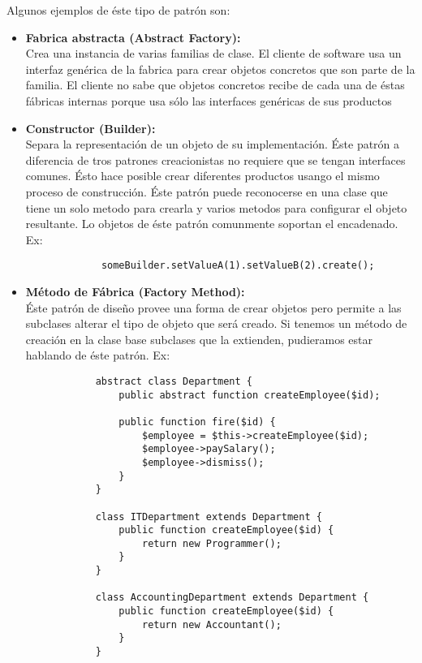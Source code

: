 \documentclass[12pt,article,oneside]{memoir}
\begin{document}
		Algunos ejemplos de \'este tipo de patr\'on son:
		
		\begin{itemize}
			\item \textbf{Fabrica abstracta (Abstract Factory):}\\
			Crea una instancia de varias familias de clase. El cliente 
			de software	usa un interfaz gen\'erica de la fabrica para crear objetos concretos que son parte de la familia. 
			El cliente no sabe que objetos concretos recibe de cada una de \'estas f\'abricas internas porque usa s\'olo las 
			interfaces gen\'ericas de sus productos
			
			\item \textbf{Constructor (Builder):}\\
			Separa la representaci\'on de un objeto de su implementaci\'on. \'Este 
			patr\'on a diferencia de tros patrones creacionistas no requiere que se tengan interfaces comunes. \'Esto hace 
			posible crear diferentes productos usango el mismo proceso de construcci\'on. \'Este patr\'on puede reconocerse 
			en una clase que tiene un solo metodo para crearla y varios metodos para configurar el objeto resultante. Lo objetos 
			de \'este patr\'on comunmente soportan el encadenado. Ex:\\
			\begin{verbatim}
			 someBuilder.setValueA(1).setValueB(2).create();
			\end{verbatim}
			
			\item \textbf{M\'etodo de F\'abrica (Factory Method):}\\
			\'Este patr\'on de dise\~no provee una forma de crear objetos pero permite a las subclases alterar el tipo de 
			objeto que ser\'a creado. Si tenemos un m\'etodo de creaci\'on en la clase base subclases que la extienden, 
			pudieramos estar hablando de \'este patr\'on. Ex:
			\begin{verbatim}
			abstract class Department {
				public abstract function createEmployee($id);
				
				public function fire($id) {
        			$employee = $this->createEmployee($id);
        			$employee->paySalary();
        			$employee->dismiss();
    			}
			}
			
			class ITDepartment extends Department {
				public function createEmployee($id) {
					return new Programmer();
				}
			}
			
			class AccountingDepartment extends Department {
				public function createEmployee($id) {
					return new Accountant();
				}
			}
			\end{verbatim}
			

\end{itemize}
\end{document}
